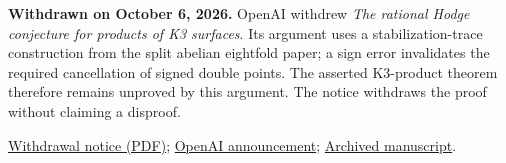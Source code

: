 \documentclass[11pt]{article}
\begin{document}
\textbf{Withdrawn on October 6, 2026.}
OpenAI withdrew \emph{The rational Hodge conjecture for products of K3 surfaces}.
Its argument uses a stabilization-trace construction from the split abelian
eightfold paper; a sign error invalidates the required cancellation of signed
double points. The asserted K3-product theorem therefore remains unproved
by this argument. The notice withdraws the proof without claiming a disproof.

\href{https://github.com/openai/math/blob/main/preprints/The-rational-Hodge-conjecture-for-products-of-K3-surfaces-October-4-2026/hodge-conjecture-products-k3.pdf}{Withdrawal notice (PDF)}; \href{https://github.com/openai/math/blob/301488868beec11bfd897168433b0a64f5258559/preprints/The-rational-Hodge-conjecture-for-products-of-K3-surfaces-October-4-2026/README.md}{OpenAI announcement}; \href{https://github.com/openai/math/blob/adc7f1241b42e322a6451854ab7e4b4c146bf78a/preprints/The-rational-Hodge-conjecture-for-products-of-K3-surfaces-October-4-2026/hodge-conjecture-products-k3.pdf}{Archived manuscript}.
\end{document}
